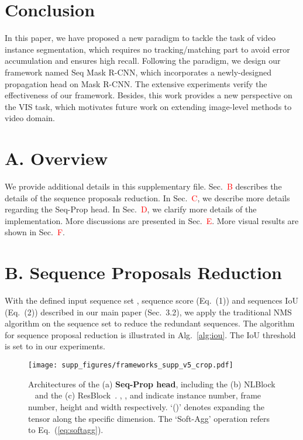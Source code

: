 \documentclass[10pt,twocolumn,letterpaper]{article}
\begin{document}
\section{Conclusion}
	In this paper, we have proposed a new paradigm to tackle the task of video instance segmentation, which requires no tracking/matching part to avoid error accumulation and ensures high recall.
	Following the paradigm, we design our framework named Seq Mask R-CNN, which incorporates a newly-designed propagation head on Mask R-CNN.
	The extensive experiments verify the effectiveness of our framework.
	Besides, this work provides a new perspective on the VIS task, which motivates future work on extending image-level methods to video domain.
	
	\clearpage
	{\small
		
		
	}
	
\newpage
	
	\section*{A. Overview}
	We provide additional details in this supplementary file. Sec.~\textcolor{red}{B} describes the details of the sequence proposals reduction. In Sec.~\textcolor{red}{C}, we describe more details regarding the Seq-Prop head. In Sec.~\textcolor{red}{D}, we clarify more details of the implementation. More discussions are presented in Sec.~\textcolor{red}{E}. More visual results are shown in Sec.~\textcolor{red}{F}.
	
    \section*{B. Sequence Proposals Reduction} \label{sec:seq_reduce}
	With the defined input sequence set , sequence score (Eq.~(1)) and sequences IoU (Eq.~(2)) described in our main paper (Sec.~3.2), we apply the traditional NMS algorithm on the sequence set to reduce the redundant sequences. The algorithm for sequence proposal reduction is illustrated in Alg.~\ref{alg:iou}. The IoU threshold  is set to  in our experiments.
	
	
	\begin{figure*}[h]
		\begin{center}
			\texttt{[image: supp\_figures/frameworks\_supp\_v5\_crop.pdf]}
		\end{center}
		\caption{Architectures of the (a) \textbf{Seq-Prop head}, including the (b) NLBlock ~\cite{wang2018non} and the (c) ResBlock~\cite{he2016deep}. , ,  and  indicate instance number, frame number, height and width respectively. `()' denotes expanding the tensor along the specific dimension. The `Soft-Agg' operation refers to Eq.~(\ref{eq:softagg}).}
		\label{fig:arc}
	\end{figure*}
	
\end{document}
